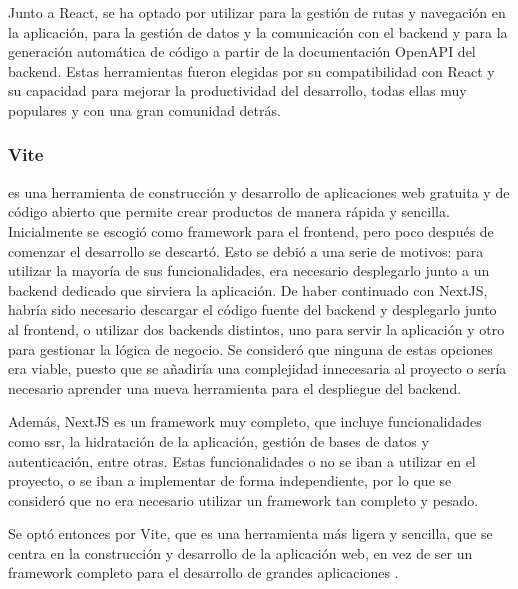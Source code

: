 Junto a React, se ha optado por utilizar  para la
gestión de rutas y navegación en la aplicación,  para
la gestión de datos y la comunicación con el \gls{backend} y 
para la generación automática de código a partir de la documentación OpenAPI del \gls{backend}. Estas
herramientas fueron elegidas por su compatibilidad con React y su capacidad para mejorar la productividad
del desarrollo, todas ellas muy populares y con una gran comunidad detrás.

\subsubsection{Vite}
\label{c08:subsubsec:vite}
 es una herramienta de construcción y desarrollo
de aplicaciones web gratuita y de código abierto que permite crear productos de
manera rápida y sencilla.
Inicialmente se escogió  como \gls{framework}
para el \gls{frontend}, pero poco después de comenzar el desarrollo se descartó.
Esto se debió a una serie de motivos: para utilizar la mayoría de sus funcionalidades,
era necesario desplegarlo junto a un \gls{backend} dedicado que sirviera
la aplicación. De haber continuado con NextJS, habría sido necesario descargar el
código fuente del \gls{backend} y desplegarlo junto al \gls{frontend}, o utilizar
dos \glspl{backend} distintos, uno para servir la aplicación y otro para
gestionar la lógica de negocio. Se consideró que ninguna de estas opciones
era viable, puesto que se añadiría una complejidad innecesaria al proyecto
o sería necesario aprender una nueva herramienta para el despliegue del
\gls{backend}.

Además, NextJS es un \gls{framework} muy completo, que incluye funcionalidades
como \gls{ssr}, la hidratación de la aplicación, gestión de bases de datos y
autenticación, entre otras. Estas funcionalidades o no se iban a utilizar en el
proyecto, o se iban a implementar de forma independiente, por lo que se
consideró que no era necesario utilizar un \gls{framework} tan completo y
pesado.

Se optó entonces por Vite, que es una herramienta más ligera y sencilla, que se
centra en la construcción y desarrollo de la aplicación web, en vez de ser un
\gls{framework} completo para el desarrollo de grandes aplicaciones
\parencites{Moronfolu2024Aug}{nextOrVite}.


